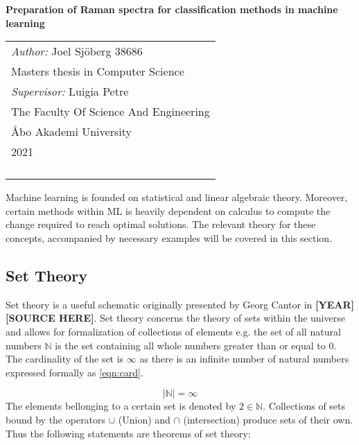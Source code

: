 \begin{titlepage}
\vspace*{144pt}
\begin{center}
\Huge\bf Preparation of Raman spectra for classification methods in machine learning


\end{center}
\enlargethispage{3cm}
\vfill

\hfill
\begin{tabular}[t]{l@{}}%
\textit{Author:} Joel Sjöberg 38686\\ %
Masters thesis in Computer Science\\ %
\textit{Supervisor:} Luigia Petre\\ %
The Faculty Of Science And Engineering\\ %
Åbo Akademi University\\ 
2021\\ %
\\
\\
\\
\\
\end{tabular}
\end{titlepage}


Machine learning is founded on statistical and linear algebraic theory. Moreover, certain methods within ML is heavily dependent on calculus to compute the change required to reach optimal solutions. The relevant theory for these concepts, accompanied by necessary examples will be covered in this section.

\subsection{Set Theory}

Set theory is a useful schematic originally presented by Georg Cantor in \textbf{[YEAR] [SOURCE HERE]}. Set theory concerns the theory of sets within the universe and allows for formalization of collections of elements e.g. the set of all natural numbers $\mathbb{N}$ is the set containing all whole numbers greater than or equal to 0. The cardinality of the set is $\infty$ as there is an infinite number of natural numbers expressed formally as \ref{eqn:card}.

\begin{equation}
\label{eqn:card}
|\mathbb{N}| = \infty
\end{equation}
The elements bellonging to a certain set is denoted by $2 \in \mathbb{N}$. 
Collections of sets bound by the operators $\cup$ (Union) and $\cap$ (intersection) produce sets of their own. Thus the following statements are theorems of set theory:


